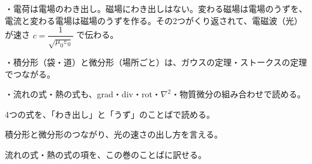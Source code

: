 \begin{taisetsu}
・電荷は電場のわき出し。磁場にわき出しはない。変わる磁場は電場のうずを、電流と変わる電場は磁場のうずを作る。その2つがくり返されて、電磁波（光）が速さ $c=\dfrac{1}{\sqrt{\mu_0\varepsilon_0}}$ で伝わる。\par
・積分形（袋・道）と微分形（場所ごと）は、ガウスの定理・ストークスの定理でつながる。\par
・流れの式・熱の式も、grad・div・rot・$\nabla^2$・物質微分の組み合わせで読める。
\end{taisetsu}



\begin{kotoba}
\small
{}
\end{kotoba}

\begin{furikaeri}
\begin{checklist}
\item 4つの式を、「わき出し」と「うず」のことばで読める。
\item 積分形と微分形のつながり、光の速さの出し方を言える。
\item 流れの式・熱の式の項を、この巻のことばに訳せる。
\end{checklist}
\end{furikaeri}


